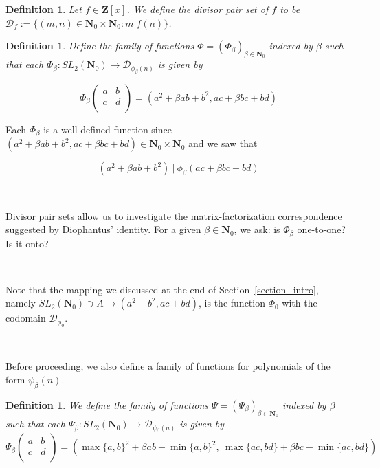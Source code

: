 \documentclass{article}
\newtheorem{definition}[theorem]{Definition}  %
\begin{document}
\begin{definition}
Let $f \in \mathbf{Z}[x]$. We define the divisor pair set of $f$ to be $\mathcal{D}_f := \{ (m, n) \in \mathbf{N}_0 \times \mathbf{N}_0 : m \lvert f(n) \}$. 
\end{definition}

\begin{definition}
Define the family of functions $\Phi = (\Phi_\beta)_{\beta \in \mathbf{N}_0}$ indexed by $\beta$ such that each $\Phi_\beta: SL_2(\mathbf{N}_0) \rightarrow \mathcal{D}_{\phi_\beta(n)}$ is given by

$$\Phi_\beta \begin{pmatrix}
    a & b \\
    c & d \\
\end{pmatrix} = (a^2 + \beta ab + b^2, ac + \beta bc + bd)$$
\end{definition}

Each $\Phi_{\beta}$ is a well-defined function since $(a^2 + \beta ab + b^2, ac + \beta bc + bd) \in \mathbf{N}_0 \times \mathbf{N}_0$ and we saw that

$$(a^2 + \beta ab + b^2) \ \lvert \ \phi_\beta(ac + \beta bc + bd)$$

\

Divisor pair sets allow us to investigate the matrix-factorization correspondence suggested by Diophantus' identity. For a given $\beta \in \mathbf{N}_0$, we ask: is $\Phi_\beta$ one-to-one? Is it onto? 

\

Note that the mapping we discussed at the end of Section~\ref{section_intro}, namely $SL_2(\mathbf{N}_0) \ni A \rightarrow (a^2 + b^2, ac + bd)$, is the function $\Phi_0$ with the codomain $\mathcal{D}_{\phi_0}$.

\

Before proceeding, we also define a family of functions for polynomials of the form $\psi_\beta(n)$.

\begin{definition}\label{Psifamily}
We define the family of functions $\Psi = (\Psi_\beta)_{\beta \in \mathbf{N}_0}$ indexed by $\beta$ such that each $\Psi_\beta : SL_2(\mathbf{N}_0) \rightarrow \mathcal{D}_{\psi_\beta(n)}$ is given by
$$\Psi_\beta \begin{pmatrix}
    a & b \\
    c & d \\
\end{pmatrix} = 
(\max \{a, b\}^2 + \beta ab - \min \{a, b \}^2,  \ \max \{ac, bd \} + \beta bc - \min \{ac, bd\})$$
\end{definition}
\end{document}
